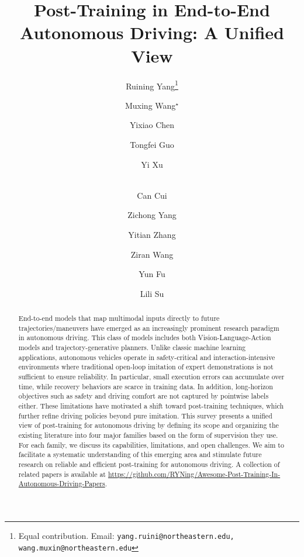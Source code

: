 \documentclass[runningheads]{llncs}
\begin{document}
\title{Post-Training in End-to-End Autonomous Driving: A Unified View}


\author{Ruining Yang\thanks{Equal contribution. Email: \texttt{yang.ruini@northeastern.edu, wang.muxin@northeastern.edu}} 
\and Muxing Wang$^{\star}$
\and Yixiao Chen
\and Tongfei Guo
\and Yi Xu
\and \\
Can Cui
\and Zichong Yang
\and Yitian Zhang
\and Ziran Wang
\and Yun Fu
\and Lili Su
}




\maketitle


\begin{abstract}

End-to-end models that map multimodal inputs directly to future trajectories/maneuvers have emerged as an increasingly prominent research paradigm in autonomous driving. This class of models includes both Vision-Language-Action models and trajectory-generative planners.
Unlike classic machine learning applications, autonomous vehicles operate in safety-critical and interaction-intensive environments where traditional open-loop imitation of expert demonstrations is not sufficient to ensure reliability.
In particular, small execution errors can accumulate over time, while recovery behaviors are scarce in training data. 
In addition, long-horizon objectives such as safety and driving comfort are not captured by pointwise labels either.
These limitations have motivated a shift toward post-training techniques, which further refine driving policies beyond pure imitation.
This survey presents a unified view of post-training for autonomous driving by defining its scope and organizing the existing literature into four major families based on the form of supervision they use.
For each family, we discuss its capabilities, limitations, and open challenges. We aim to facilitate a systematic understanding of this emerging area and stimulate future research on reliable and efficient post-training for autonomous driving.
A collection of related papers is available at \url{https://github.com/RYNing/Awesome-Post-Training-In-Autonomous-Driving-Papers}.



\end{abstract}
\end{document}

